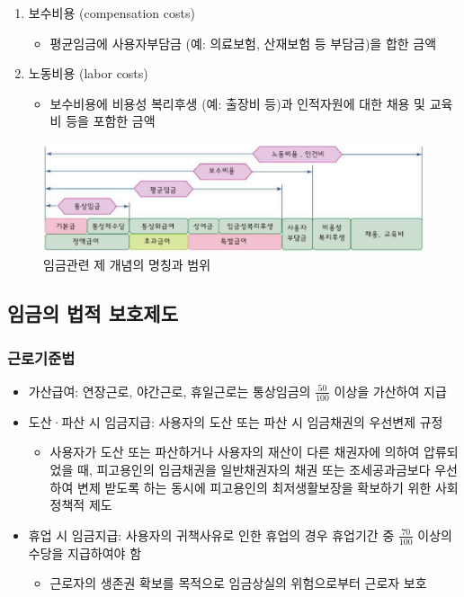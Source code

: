 \documentclass[aspectratio=169,xcolor=dvipsnames,handout]{beamer}
\begin{document}
\begin{frame}[allowframebreaks]
\begin{enumerate}[<+->]
        \framebreak%
        \item 보수비용 (compensation costs)
            \begin{itemize}[<+->]
                \item 평균임금에 사용자부담금 (예: 의료보험, 산재보험 등 부담금)을 합한 금액
            \end{itemize}
        \item 노동비용 (labor costs)
            \begin{itemize}[<+->]
                \item 보수비용에 비용성 복리후생 (예: 출장비 등)과 인적자원에 대한 채용 및 교육비 등을 포함한 금액
            \end{itemize}
    \end{enumerate}
    \centering
    \begin{figure}
        \includegraphics[width=.9\textwidth]{pic/임금범위.png}
        \caption{임금관련 제 개념의 명칭과 범위}
    \end{figure}
\end{frame}

\subsection{임금의 법적 보호제도}%

\begin{frame}
    \frametitle{근로기준법}
    \begin{itemize}[<+->]
        \item 가산급여: 연장근로, 야간근로, 휴일근로는 통상임금의 $\frac{50}{100}$ 이상을 가산하여 지급
        \item 도산·파산 시 임금지급: 사용자의 도산 또는 파산 시 임금채권의 우선변제 규정
        \begin{itemize}[<+->]
            \item 사용자가 도산 또는 파산하거나 사용자의 재산이 다른 채권자에 의하여 압류되었을 때, 피고용인의 임금채권을 일반채권자의 채권 또는 조세공과금보다 우선하여 변제 받도록 하는 동시에 피고용인의 최저생활보장을 확보하기 위한 사회정책적 제도
        \end{itemize}
        \item 휴업 시 임금지급: 사용자의 귀책사유로 인한 휴업의 경우 휴업기간 중 $\frac{70}{100}$ 이상의 수당을 지급하여야 함
        \begin{itemize}[<+->]
            \item 근로자의 생존권 확보를 목적으로 임금상실의 위험으로부터 근로자 보호
        \end{itemize}
    \end{itemize}
\end{frame}
\end{document}
